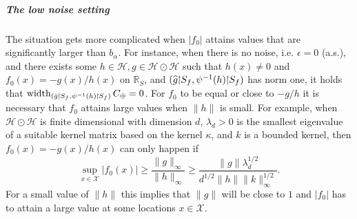 \documentclass[10pt]{amsart}
\theoremstyle{definition}\newtheorem{defi}[theo]{Definition}\newtheorem{rema}[theo]{Remark}\newtheorem{exam}[theo]{Example}\newtheorem{exem}[theo]{Example}\newtheorem{nota}[theo]{Notation}
\theoremstyle{remark}
\DeclareMathOperator{\diam}{width}
\newcommand{\restrr}
{\!\!\upharpoonright\!\!}
\newcommand{\R}{\mathbb{R}}
\newcommand{\X}{\mathcal{X}}
\newcommand{\cH}{\mathcal{H}}
\newcommand*{\mk}{\mkern -1mu}
\let\oldhat\hat
\renewcommand*{\hat}[1]{\mathchoice{\widehat{#1}}{\widehat{#1}}{\oldhat{#1}}{\oldhat{#1}}}
\begin{document}
\subparagraph{The low noise setting}
The situation gets more complicated when $|f_0|$ attains values that are significantly larger than $b_\alpha$. For instance, when there is no noise, i.e. $\epsilon = 0$ (a.s.), and there exists some $h\in \cH, g\in \cH \odot \cH$ such that $h(x) \not = 0$ and $f_0(x) = - g(x)/h(x)$ on $\R_S$, and $(\hat g\restrr S_f,\psi^{-1}(h)\restrr S_f)$ has norm one, it holds that $\diam_{(\hat g \mk\upharpoonright\mk S_f,\psi^{-1}(h) \mk\upharpoonright\mk S_f)} C_\oplus = 0$. For $f_0$ to be equal or close to $-g /h $ it is necessary that $f_0$ attains large values when $\|h\|$ is small. For example, when $\cH \odot \cH$ is finite dimensional with dimension $d$, $\lambda_d > 0$ is the smallest eigenvalue of a suitable kernel matrix based on the kernel $\kappa$, and $k$ is a bounded kernel, then $f_0(x) = - g(x)/h(x)$ can only happen if
\[
\sup_{x\in \X} |f_0(x)| \geq \frac{\|g\|_\infty}{\|h\|_\infty} \geq \frac{\|g\| \lambda_d^{1/2}}{d^{1/2} \|h\| \|k\|_\infty^{1/2}}.
\]
For a small value of $\|h\|$ this implies that $\|g\|$ will be close to $1$ and $|f_0|$ has to attain a large value at some locations $x \in \X$.
\end{document}
